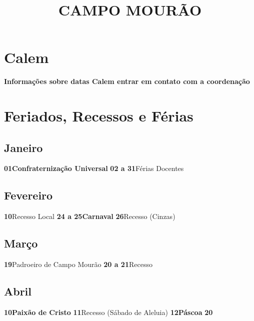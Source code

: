 \documentclass[thesis]{hmcposter}
\author{ }
\title{CAMPO MOURÃO}
\begin{document}
\begin{poster}
\normalsize\section{\color{hmcorange}Calem}\textbf{Informações sobre datas Calem entrar em contato com a coordenação} \newpage\onespacing \small \section{\color{hmcorange}Feriados, Recessos e Férias}\subsection{Janeiro}\textbf{01}\quad \quad \quad \quad \textbf{Confraternização Universal} \newline\textbf{02 a 31}\quad \quad Férias Docentes \newline\subsection{Fevereiro}\textbf{10}\quad \quad \quad \quad Recesso Local \newline\textbf{24 a 25}\quad \quad \textbf{Carnaval} \newline\textbf{26}\quad \quad \quad \quad Recesso (Cinzas) \newline\subsection{Março}\textbf{19}\quad \quad \quad \quad Padroeiro de Campo Mourão \newline\textbf{20 a 21}\quad \quad Recesso \newline\subsection{Abril}\textbf{10}\quad \quad \quad \quad \textbf{Paixão de Cristo} \newline\textbf{11}\quad \quad \quad \quad Recesso (Sábado de Aleluia) \newline\textbf{12}\quad \quad \quad \quad \textbf{Páscoa} \newline\textbf{20}\quad \quad \quad 
\end{poster}
\end{document}
